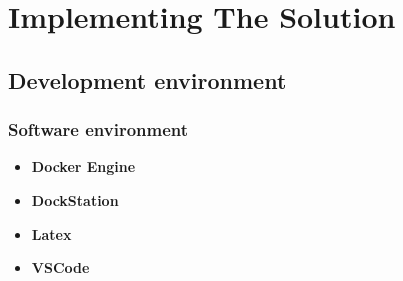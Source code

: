 \chapter{Implementing The Solution}
\section{Development environment}

\subsection{Software environment}

\begin{itemize}
    \item \textbf{Docker Engine}
    \item \textbf{DockStation}
    \item \textbf{Latex}
    \item \textbf{VSCode}
\end{itemize}